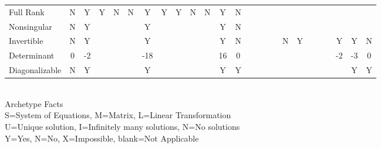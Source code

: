 \begin{center}
\begin{tabular}{l*{24}{|c}}
 Full Rank            &N  &Y  &Y  &N  &N  &Y   &Y  &Y  &N  &N  &Y  &N  &   &   &   &   &   &   &   &   &   &   &   &  \\
 Nonsingular          &N  &Y  &   &   &   &Y   &   &   &   &   &Y  &N  &   &   &   &   &   &   &   &   &   &   &   &  \\
 Invertible           &N  &Y  &   &   &   &Y   &   &   &   &   &Y  &N  &   &   &   &   &N  &Y  &   &   &   &Y  &Y  &N \\
 Determinant          &0  &-2 &   &   &   &-18 &   &   &   &   &16 &0  &   &   &   &   &   &   &   &   &   &-2 &-3 &0 \\
 Diagonalizable       &N  &Y  &   &   &   &Y   &   &   &   &   &Y  &Y  &   &   &   &   &   &   &   &   &   &   &Y  &Y
\end{tabular}\\[18pt]
{\Large Archetype Facts}\\[6pt]
S=System of Equations, M=Matrix, L=Linear Transformation\\
U=Unique solution, I=Infinitely many solutions, N=No solutions\\
Y=Yes, N=No, X=Impossible, blank=Not Applicable
\end{center}




